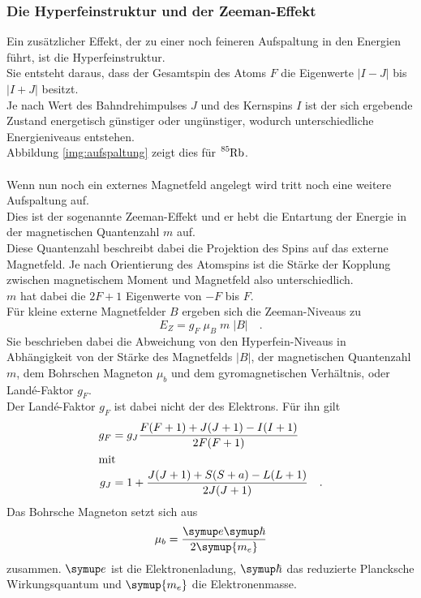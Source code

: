 \subsubsection{Die Hyperfeinstruktur und der Zeeman-Effekt}

\noindent
Ein zusätzlicher Effekt, der zu einer noch feineren Aufspaltung in den Energien führt, ist die Hyperfeinstruktur.\\
Sie entsteht daraus, dass der Gesamtspin des Atoms $F$ die Eigenwerte $\bigl| I - J \bigr|$ bis $\bigl| I + J \bigr|$ besitzt.\\
Je nach Wert des Bahndrehimpulses $J$ und des Kernspins $I$ ist der sich ergebende Zustand energetisch günstiger oder ungünstiger, wodurch unterschiedliche Energieniveaus entstehen.\\
Abbildung \ref{img:aufspaltung} zeigt dies für $\ce{^{85}Rb}$.\\\\

\noindent
Wenn nun noch ein externes Magnetfeld angelegt wird tritt noch eine weitere Aufspaltung auf.\\
Dies ist der sogenannte Zeeman-Effekt und er hebt die Entartung der Energie in der magnetischen Quantenzahl $m$ auf.\\
Diese Quantenzahl beschreibt dabei die Projektion des Spins auf das externe Magnetfeld. 
Je nach Orientierung des Atomspins ist die Stärke der Kopplung zwischen magnetischem Moment und Magnetfeld also unterschiedlich.\\
$m$ hat dabei die $2F+1$ Eigenwerte von $-F$ bis $F$.\\
Für kleine externe Magnetfelder $B$  ergeben sich die Zeeman-Niveaus zu 
\begin{equation}
    E_Z = g_F\; \mu_B \; m \;\bigl| B \bigr|\quad .
    \label{eqn:zeeman}
\end{equation}
Sie beschrieben dabei die Abweichung von den Hyperfein-Niveaus in Abhängigkeit von der Stärke des Magnetfelds $\bigl| B \bigr|$, 
der magnetischen Quantenzahl $m$, dem Bohrschen Magneton $\mu_b$ und dem gyromagnetischen Verhältnis, oder Landé-Faktor $g_F$.\\
Der Landé-Faktor $g_F$ ist dabei nicht der des Elektrons. Für ihn gilt
\begin{align*}
    g_F &= g_J\frac{F(F+1) + J(J+1) - I(I+1)}{2F(F+1)}\\
    \intertext{mit}
    g_J &= 1 + \frac{J(J+1) + S(S+a) -L(L+1)}{2J(J+1)} \quad .
\end{align*}
Das Bohrsche Magneton setzt sich aus 
\begin{equation*}
    \mu_b = \frac{\symup e \symup \hbar}{2\symup{m_e}}
\end{equation*}
zusammen. $\symup e$  ist die Elektronenladung\cite{e0}, $\symup \hbar$ das reduzierte Plancksche Wirkungsquantum\cite{Planck} und $\symup{m_e}$ die Elektronenmasse\cite{m_e}.

